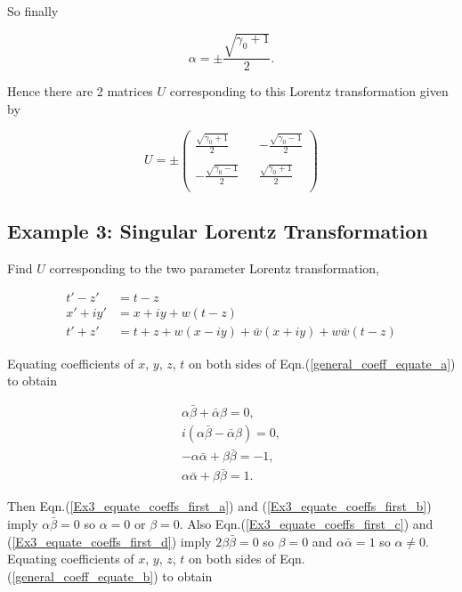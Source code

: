 \noindent So finally

\begin{equation*}
\alpha = \pm \frac{\sqrt{\gamma_0 + 1}}{2}.
\end{equation*}

\noindent Hence there are 2 matrices $U$ corresponding to this Lorentz transformation given by

\begin{equation*}
U = \pm
\left(
\begin{array}{ccc}
\frac{\sqrt{\gamma_0 + 1}}{2}   & & -\frac{\sqrt{\gamma_0 - 1}}{2} \\
 & & \\
- \frac{\sqrt{\gamma_0 - 1}}{2} & &  \frac{\sqrt{\gamma_0 + 1}}{2}  \\
\end{array}
\right)
\end{equation*}

\subsection{Example 3: Singular Lorentz Transformation}\label{Special_Linear_Matrices_Example_3}

\noindent Find $U$ corresponding to the two parameter Lorentz transformation,

\begin{align*}
t'-z' & = t-z \\
x'+iy' & = x + iy + w(t-z) \\
t'+z' & = t+z + w(x-iy) + \bar{w} (x + iy) + w \bar{w} (t-z)
\end{align*}

\noindent Equating coefficients of $x$, $y$, $z$, $t$ on both sides of Eqn.(\ref{general_coeff_equate_a}) to obtain

\begin{subequations}
\begin{gather}\label{Ex3_equate_coeffs_first_a}
\alpha \bar{\beta} + \bar{\alpha} \beta = 0, \\\label{Ex3_equate_coeffs_first_b}
i (\alpha \bar{\beta} - \bar{\alpha} \beta) = 0, \\\label{Ex3_equate_coeffs_first_c}
-\alpha \bar{\alpha} + \beta \bar{\beta} = -1, \\\label{Ex3_equate_coeffs_first_d}
\alpha \bar{\alpha} + \beta \bar{\beta} = 1. 
\end{gather}
\end{subequations}

\noindent Then Eqn.(\ref{Ex3_equate_coeffs_first_a}) and (\ref{Ex3_equate_coeffs_first_b}) imply $\alpha \bar{\beta} = 0$ so $\alpha = 0$ or $\beta = 0$. Also Eqn.(\ref{Ex3_equate_coeffs_first_c}) and (\ref{Ex3_equate_coeffs_first_d}) imply $2\beta\bar{\beta} = 0$ so $\beta = 0$ and $\alpha \bar{\alpha} = 1$ so $\alpha \neq 0$. Equating coefficients of $x$, $y$, $z$, $t$ on both sides of Eqn.(\ref{general_coeff_equate_b}) to obtain

